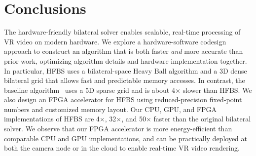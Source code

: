 \section{Conclusions}

The hardware-friendly bilateral solver enables scalable, real-time processing of VR video on modern hardware.
We explore a hardware-software codesign approach to construct an algorithm that is both faster \emph{and} more accurate than prior work, optimizing algorithm details and hardware implementation together.
In particular, HFBS uses a bilateral-space Heavy Ball algorithm and a 3D dense bilateral grid that allows fast and predictable memory accesses.
In contrast, the baseline algorithm~\cite{BarronPoole2016} uses a 5D sparse grid and is about 4$\times$ slower than HFBS.
We also design an FPGA accelerator for HFBS using reduced-precision fixed-point numbers and customized memory layout.
Our CPU, GPU, and FPGA implementations of HFBS are 4$\times$, 32$\times$, and 50$\times$ faster than the original bilateral solver.
We observe that our FPGA accelerator is more energy-efficient than comparable CPU and GPU implementations, and can be practically deployed at both the camera node or in the cloud to enable real-time VR video rendering.
